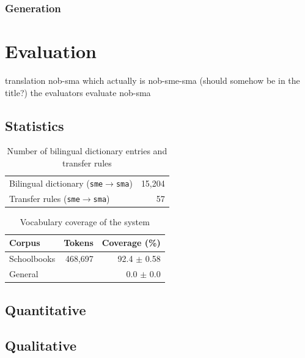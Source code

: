 \documentclass[a4paper,11pt,twocolumn]{article}
\begin{document}
\subsubsection{Generation}

\section{Evaluation}
 translation nob-sma which actually is nob-sme-sma (should somehow be in the title?) 
 the evaluators evaluate nob-sma

\subsection{Statistics}
\begin{table}
  \begin{center}
    \begin{tabular}{|l|r|}
      \hline
      Bilingual dictionary ({\tt sme}$\rightarrow${\tt sma}) & 15,204 \\ %
      Transfer rules ({\tt sme}$\rightarrow${\tt sma}) & 57 \\
      \hline
    \end{tabular}
    \label{table:transfer}
    \caption{Number of bilingual dictionary entries and transfer rules}
  \end{center}
\end{table}

\begin{table}
  \begin{center}
    \begin{tabular}{|l|r|r|}
      \hline
      \textbf{Corpus} & \textbf{Tokens} & \textbf{Coverage (\%)}  \\
      \hline
      Schoolbooks     & 468,697 & 92.4 $\pm$ 0.58 \\
      General         & & 0.0 $\pm$ 0.0 \\
      \hline
    \end{tabular}
    \label{table:coverage}
    \caption{Vocabulary coverage of the system}
  \end{center}
\end{table}

\subsection{Quantitative}
\subsection{Qualitative}
\end{document}
